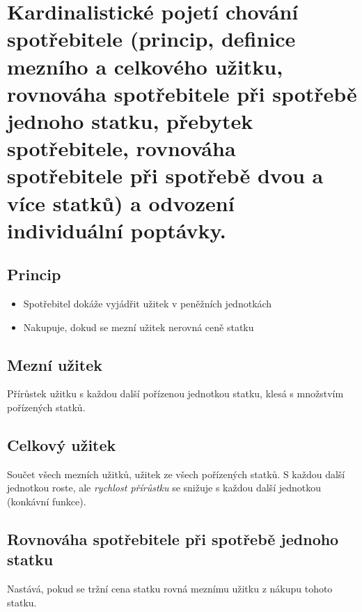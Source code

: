 \clearpage
\section{Kardinalistické pojetí chování spotřebitele (princip, definice mezního a celkového
užitku, rovnováha spotřebitele při spotřebě jednoho statku, přebytek spotřebitele,
rovnováha spotřebitele při spotřebě dvou a více statků) a odvození individuální
poptávky.}

\subsection{Princip}
\begin{itemize}
    \item Spotřebitel dokáže vyjádřit užitek v peněžních jednotkách
    \item Nakupuje, dokud se mezní užitek nerovná ceně statku
\end{itemize}

\subsection{Mezní užitek}
Přírůstek užitku s každou další pořízenou jednotkou statku, klesá s množstvím pořízených statků.

\subsection{Celkový užitek}
Součet všech mezních užitků, užitek ze všech pořízených statků. S každou další jednotkou roste,
ale \textit{rychlost přírůstku} se snižuje s každou další jednotkou (konkávní funkce).

\subsection{Rovnováha spotřebitele při spotřebě jednoho statku}
Nastává, pokud se tržní cena statku rovná meznímu užitku z nákupu tohoto statku.

